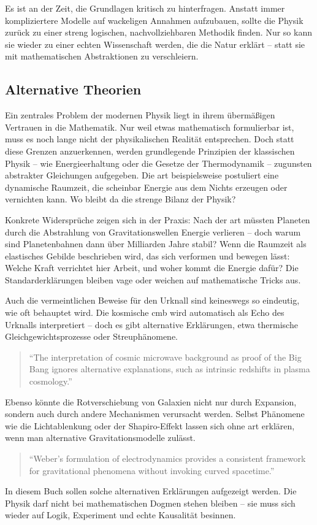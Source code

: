 Es ist an der Zeit, die Grundlagen kritisch zu hinterfragen. Anstatt immer kompliziertere Modelle auf wackeligen Annahmen aufzubauen, sollte die Physik zurück zu einer streng logischen,
nachvollziehbaren Methodik finden. Nur so kann sie wieder zu einer echten Wissenschaft werden, die die Natur erklärt – statt sie mit mathematischen Abstraktionen zu verschleiern.

\subsection{Alternative Theorien}
Ein zentrales Problem der modernen Physik liegt in ihrem übermäßigen Vertrauen in die Mathematik. Nur weil etwas mathematisch formulierbar ist,
muss es noch lange nicht der physikalischen Realität entsprechen. Doch statt diese Grenzen anzuerkennen, werden grundlegende Prinzipien der klassischen Physik – wie Energieerhaltung
oder die Gesetze der Thermodynamik – zugunsten abstrakter Gleichungen aufgegeben. Die \gls{art} beispielsweise postuliert eine dynamische Raumzeit, die scheinbar Energie aus dem Nichts
erzeugen oder vernichten kann. Wo bleibt da die strenge Bilanz der Physik?

Konkrete Widersprüche zeigen sich in der Praxis: Nach der \gls{art} müssten Planeten durch die Abstrahlung von Gravitationswellen Energie verlieren – doch warum sind Planetenbahnen dann über
Milliarden Jahre stabil? Wenn die Raumzeit als elastisches Gebilde beschrieben wird, das sich verformen und bewegen lässt: Welche Kraft verrichtet hier Arbeit, und woher kommt die Energie
dafür? Die Standarderklärungen bleiben vage oder weichen auf mathematische Tricks aus.

Auch die vermeintlichen Beweise für den Urknall sind keineswegs so eindeutig, wie oft behauptet wird. Die kosmische \gls{cmb} wird automatisch als Echo des Urknalls
interpretiert – doch es gibt alternative Erklärungen, etwa thermische Gleichgewichtsprozesse oder Streuphänomene.
\begin{quote}
    \enquote{The interpretation of cosmic microwave background as proof of the Big Bang ignores alternative explanations, such as intrinsic redshifts in plasma cosmology.} \cite{Arp1998}
\end{quote}
Ebenso könnte die Rotverschiebung von Galaxien nicht nur durch Expansion, sondern auch durch andere Mechanismen verursacht werden. Selbst Phänomene wie die Lichtablenkung oder der
Shapiro-Effekt lassen sich ohne \gls{art} erklären, wenn man alternative Gravitationsmodelle zulässt.
\begin{quote}
    \enquote{Weber's formulation of electrodynamics provides a consistent framework for gravitational phenomena without invoking curved spacetime.} \cite{WeberElectrodynamics}
\end{quote}
In diesem Buch sollen solche alternativen Erklärungen aufgezeigt werden. Die Physik darf nicht bei mathematischen Dogmen stehen bleiben – sie muss sich wieder auf Logik, Experiment und
echte Kausalität besinnen.

